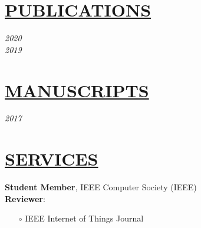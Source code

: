 \documentclass[11pt]{article}
\begin{document}
\section*{\centering\underline{PUBLICATIONS}}
\noindent\textit{2020} \\[5mm] %
\noindent\textit{2019} 
\vspace{20mm} %

%
\section*{\centering\underline{MANUSCRIPTS}}
\noindent\textit{2017} 
\vspace{20mm} %

%
\section*{\centering\underline{SERVICES}}
\noindent\textbf{Student Member}, IEEE Computer Society (IEEE)\\
\noindent\textbf{Reviewer}:
\begin{itemize}[noitemsep, nolistsep]
    \item[$\circ$] IEEE Internet of Things Journal
\end{itemize}
\end{document}
